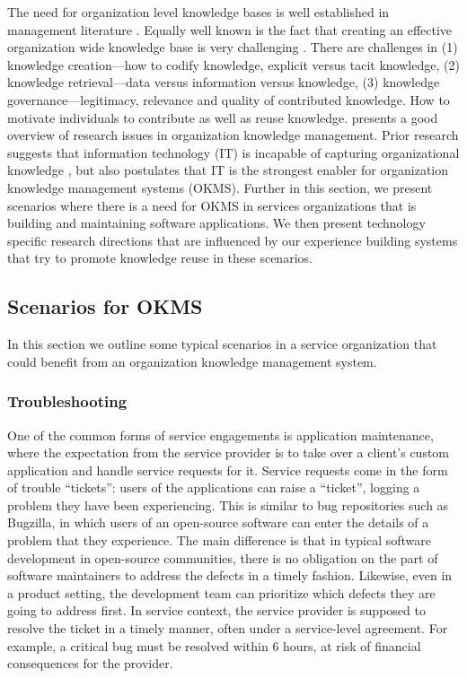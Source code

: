 The need for organization level knowledge bases is well established in management literature \cite{}. Equally well known is the fact that creating an effective organization wide knowledge base is very challenging \cite{}. There are challenges in (1) knowledge creation---how to codify knowledge, explicit versus tacit knowledge, (2) knowledge retrieval---data versus information versus knowledge, (3) knowledge governance---legitimacy, relevance and quality of contributed knowledge. How to motivate individuals to contribute as well as reuse knowledge. \cite{} presents a good overview of research issues in organization knowledge management. Prior research suggests that information technology (IT) is incapable of capturing organizational knowledge \cite{}, but also postulates that IT is the strongest enabler for organization knowledge management systems (OKMS). Further in this section, we present scenarios where there is a need for OKMS in services organizations that is building and maintaining software applications. We then present technology specific research directions that are influenced by our experience building systems that try to promote knowledge reuse in these scenarios. 

\subsection{Scenarios for OKMS}

In this section we outline some typical scenarios in a service organization that could benefit from an organization knowledge management system. 

\subsubsection{Troubleshooting}

One of the common forms of service engagements is application maintenance, where the expectation from the service provider is to take over a client's custom application and handle service requests for it.  Service requests come in the form of trouble ``tickets'': users of the applications can raise a ``ticket'', logging a problem they have been experiencing. This is similar to bug repositories such as Bugzilla, in which users of an open-source software can enter the details of a problem that they experience.  The main difference is that in typical software development in open-source communities, there is no obligation on the part of software maintainers to address the defects in a timely fashion. Likewise, even in a product setting, the development team can prioritize which defects they are going to address first.  In service context, the service provider is supposed to resolve the ticket in a timely manner, often under a service-level agreement. For example, a critical bug must be resolved within 6 hours, at risk of financial consequences for the provider. 

